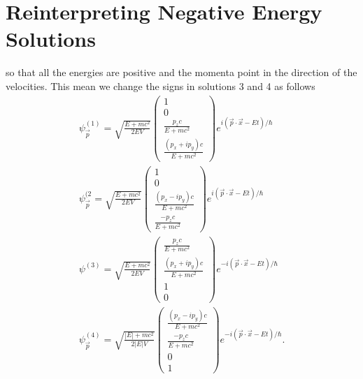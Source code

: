 \documentclass{report}
\begin{document}
\section{Reinterpreting Negative Energy Solutions}
so that all the energies are positive and the momenta point in the direction of the velocities. This mean we change the signs in solutions 3 and 4 as follows
\\
\begin{align*}
	\psi^{(1)}_{\vec{p}} = \sqrt{\frac{E + mc^2}{2EV}} \begin{pmatrix} 1 \\ 0 \\ \frac{p_{z}c}{E + mc^2} \\ \frac{(p_{x} + ip_{y})c}{E+mc^2} \end{pmatrix} e^{i \left( \vec{p} \cdot \vec{x} - Et \right) / \hbar} \\
	\psi^{(2}_{\vec{p}} = \sqrt{\frac{E + mc^2}{2EV}} \begin{pmatrix} 1 \\ 0 \\ \frac{(p_{x} - ip_{y})c}{E + mc^2} \\ \frac{-p_{z}c}{E + mc^2} \end{pmatrix} e^{i \left( \vec{p} \cdot \vec{x} - Et \right) / \hbar}                       \\
	\psi^{(3)} = \sqrt{\frac{E + mc^2}{2EV}} \begin{pmatrix} \frac{p_{z}c}{E + mc^2} \\ \frac{(p_{x} + ip_{y})c}{E + mc^2} \\ 1 \\ 0 \end{pmatrix} e^{-i\left( \vec{p}\cdot \vec{x} -Et \right) / \hbar }         \\
	\psi^{(4)}_{\vec{p}} = \sqrt{\frac{\left| E \right| + mc^2}{2 \left| E \right| V}}  \begin{pmatrix} \frac{(p_{x} - ip_{y})c}{E + mc^2} \\ \frac{-p_{z}c}{E + mc^2} \\ 0 \\1 \end{pmatrix} e^{-i \left( \vec{p} \cdot \vec{x} - Et \right) / \hbar }
	.\end{align*}
\end{document}
